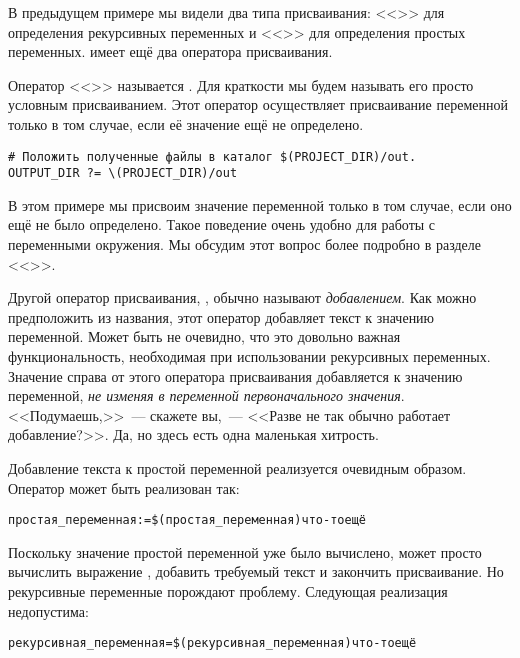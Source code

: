 В предыдущем примере мы видели два типа присваивания: <<\command{=}>>
для определения рекурсивных переменных и <<\command{:=}>> для
определения простых переменных. \GNUmake{} имеет ещё два оператора
присваивания.

Оператор <<>> называется . Для краткости мы будем называть его просто
условным присваиванием. Этот оператор осуществляет присваивание
переменной только в том случае, если её значение ещё не определено.

{\footnotesize
\begin{verbatim}
# Положить полученные файлы в каталог $(PROJECT_DIR)/out.
OUTPUT_DIR ?= \(PROJECT_DIR)/out
\end{verbatim}
}

В этом примере мы присвоим значение переменной 
только в том случае, если оно ещё не было определено. Такое поведение
очень удобно для работы с переменными окружения. Мы обсудим этот
вопрос более подробно в разделе
<<>>.

Другой оператор присваивания, \command{+=}, обычно называют
\emph{добавлением}. Как можно предположить из названия, этот оператор
добавляет текст к значению переменной. Может быть не очевидно, что это
довольно важная функциональность, необходимая при использовании
рекурсивных переменных. Значение справа от этого оператора
присваивания добавляется к значению переменной, \emph{не изменяя
в переменной первоначального значения}. <<Подумаешь,>>~--- скажете
вы,~--- <<Разве не так обычно работает добавление?>>. Да, но здесь
есть одна маленькая хитрость.

Добавление текста к простой переменной реализуется очевидным образом.
Оператор \command{+=} может быть реализован так:

{\footnotesize
\begin{alltt}
простая\_переменная := \$(простая\_переменная) что-то ещё
\end{alltt}
}

Поскольку значение простой переменной уже было вычислено, \GNUmake{}
может просто вычислить выражение ,
добавить требуемый текст и закончить присваивание. Но рекурсивные
переменные порождают проблему. Следующая реализация недопустима:

{\footnotesize
\begin{alltt}
рекурсивная\_переменная = \$(рекурсивная\_переменная) что-то ещё
\end{alltt}
}

